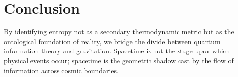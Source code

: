 \documentclass[11pt,a4paper]{article}
\begin{document}
\section{Conclusion}
By identifying entropy not as a secondary thermodynamic metric but as the ontological foundation of reality, we bridge the divide between quantum information theory and gravitation. Spacetime is not the stage upon which physical events occur; spacetime is the geometric shadow cast by the flow of information across cosmic boundaries.



\end{document}
